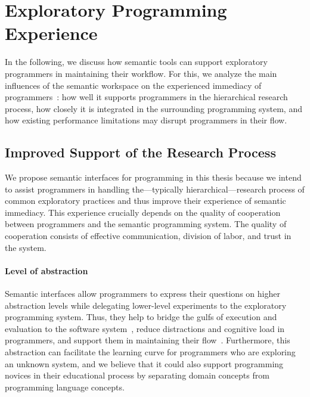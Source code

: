 
\section{Exploratory Programming Experience}
\label{sec:discussion/experience}

In the following, we discuss how semantic tools can support exploratory programmers in maintaining their workflow.
For this, we analyze the main influences of the semantic workspace on the experienced immediacy of programmers~\cite{ungar1997debugging}: how well it supports programmers in the hierarchical research process, how closely it is integrated in the surrounding programming system, and how existing performance limitations may disrupt programmers in their flow.

\subsection*{Improved Support of the Research Process}
\label{sec:discussion/experience/process}

We propose semantic interfaces for programming in this thesis because we intend to assist programmers in handling the---typically hierarchical---research process of common exploratory practices and thus improve their experience of semantic immediacy.
This experience crucially depends on the quality of cooperation between programmers and the semantic programming system.
The quality of cooperation consists of effective communication, division of labor, and trust in the system.

\paragraph{Level of abstraction}
\label{par:discussion/experience/process/abstraction}

Semantic interfaces allow programmers to express their questions on higher abstraction levels while delegating lower-level experiments to the exploratory programming system.
Thus, they help to bridge the gulfs of execution and evaluation to the software system~\cite{norman1986cognitive}, reduce distractions and cognitive load in programmers, and support them in maintaining their flow~\cite{csikszentmihalyi2008flow}.
Furthermore, this abstraction can facilitate the learning curve for programmers who are exploring an unknown system, and we believe that it could also support programming novices in their educational process by separating domain concepts from programming language concepts.

